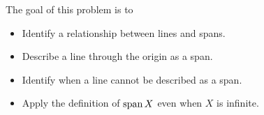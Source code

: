 \documentclass{workbook}
\newcommand{\bookonlynewpage}{\begin{bookonly}\newpage\end{bookonly}}
\begin{document}
\begin{slide}
	\bookonlynewpage
	\question
	\begin{annotation}
		\begin{goals}

			The goal of this problem is to
			\begin{itemize}
				\item Identify a relationship between lines and spans.
				\item Describe a line through the origin as a span.
				\item Identify when a line cannot be described as a span.
				\item Apply the definition of $\operatorname{span} X$ even when $X$ is infinite.
			\end{itemize}
		\end{goals}


\end{annotation}
\end{slide}
\end{document}
